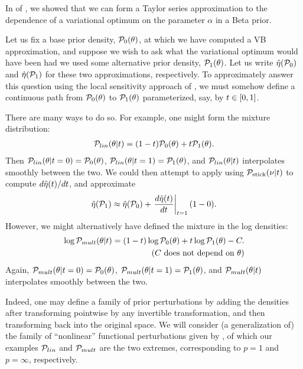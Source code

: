 In  of , we showed that
we can form a Taylor series approximation to the dependence of a variational
optimum on the parameter $\alpha$ in a Beta prior.

Let us fix a base prior density, $\mathcal{P}_{0}(\theta)$, at which we have computed a
VB approximation, and suppose we wish to ask what the variational optimum would
have been had we used some alternative prior density, $\mathcal{P}_{1}(\theta)$.  Let us
write $\hat\eta(\mathcal{P}_{0})$ and $\hat\eta(\mathcal{P}_{1})$ for these two approximations,
respectively.  To approximately answer this question using the local sensitivity
approach of , we must somehow define a continuous path
from $\mathcal{P}_{0}(\theta)$ to $\mathcal{P}_{1}(\theta)$ parameterized, say, by $t \in [0, 1]$.

There are many ways to do so.  For example, one might form the mixture
distribution:
%
\begin{align*}
%
\p_{lin}(\theta \vert \t) =
    (1- \t) \pbase(\theta) + \t \palt(\theta).
%
\end{align*}
%
Then $\mathcal{P}_{lin}(\theta \vert t=0) = \mathcal{P}_{0}(\theta)$, $\mathcal{P}_{lin}(\theta \vert t=1) =
\mathcal{P}_{1}(\theta)$, and $\mathcal{P}_{lin}(\theta \vert t)$ interpolates smoothly between the
two.  We could then attempt to apply  using $\mathcal{P}_{\mathrm{stick}}(\nu \vert
t)$ to compute $d\hat\eta(t) / dt$, and approximate
%
\begin{align*}
%
\etaopt(\palt) \approx \etaopt(\pbase) + \fracat{d \etaopt(\t)}{d\t}{\t=1}(1 - 0).
%
\end{align*}
%
However, we might alternatively have defined the mixture in the log densities:
%
\begin{align*}
%
\log \p_{mult}(\theta \vert \t) =
    (1- \t) \log\pbase(\theta) + \t \log\palt(\theta) -
    \const. \\ \constdesc{\theta}
%
\end{align*}
%
Again, $\mathcal{P}_{mult}(\theta \vert t=0) = \mathcal{P}_{0}(\theta)$, $\mathcal{P}_{mult}(\theta \vert
t=1) = \mathcal{P}_{1}(\theta)$, and $\mathcal{P}_{mult}(\theta \vert t)$ interpolates smoothly
between the two.

Indeed, one may define a family of prior perturbations by adding the densities
after transforming pointwise by any invertible transformation, and then
transforming back into the original space.  We will consider (a generalization
of) the family of ``nonlinear'' functional perturbations given by
\citep{gustafson:1996:local}, of which our examples $\mathcal{P}_{lin}$ and $\mathcal{P}_{mult}$
are the two extremes, corresponding to $p=1$ and $p=\infty$, respectively.

